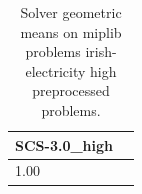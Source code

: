 \begin{table}
\caption{Solver geometric means on miplib problems irish-electricity high preprocessed problems.}
\label{t-miplib problems irish-electricity high preprocessed-geom_mean}
\begin{tabular}{lc}
\toprule
SCS-3.0_high \\
\midrule
1.00 \\
\bottomrule
\end{tabular}
\end{table}
